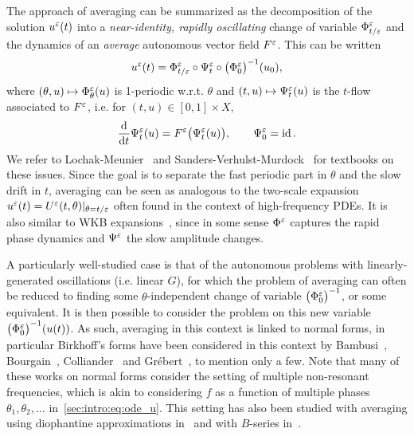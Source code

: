 %

The approach of averaging can be summarized as the decomposition of the
solution \( u^\varepsilon(t) \) into a \textit{near-identity, rapidly oscillating}
change of variable \(\Phi^\varepsilon_{t/\varepsilon} \) and the dynamics of an
\textit{average} autonomous vector field \( F^\varepsilon \). This can be written
\begin{equation} \label{sec:intro:eq:decomp_u}
  u^\varepsilon(t) = \Phi^\varepsilon_{t/\varepsilon} \circ \Psi^\varepsilon_t \circ 
    \big( \Phi^\varepsilon_0 \big)^{-1} (u_0), 
\end{equation}
where \( (\theta,u) \mapsto \Phi^\varepsilon_\theta(u) \) is 1-periodic w.r.t.
\( \theta \) and \( (t,u) \mapsto \Psi^\varepsilon_t(u) \) is the $t$-flow
associated to \( F^\varepsilon \), i.e. for $(t,u) \in [0,1] \times X$, 
\begin{equation}
  \frac{\mathrm{d}}{\mathrm{d} t} \Psi^\varepsilon_t(u) = F^\varepsilon \big( \Psi^\varepsilon_t(u) \big) ,
  \qquad \Psi^\varepsilon_0 = \operatorname{id} . 
\end{equation}
We refer to Lochak-Meunier~\cite{lochak.1988.multiphase} and
Sanders-Verhulst-Murdock~\cite{sanders.2007.averaging} for textbooks on
these issues. Since the goal is to separate the fast periodic part in
$\theta$ and the slow drift in $t$, averaging can be seen as analogous
to the two-scale expansion $u^\varepsilon(t) = U^\varepsilon(t, \theta) |_{\theta =
t/\varepsilon}$ often found in the context of high-frequency PDEs. It is also
similar to WKB expansions~\cite{wentzel.1926.eine,
kramers.1926.wellenmechanik, brillouin.1926.remarques}, since in some
sense $\Phi^\varepsilon$ captures the rapid phase dynamics and $\Psi^\varepsilon$ the
slow amplitude changes. 

A particularly well-studied case is that of the autonomous problems with
linearly-generated oscillations (i.e. linear $G$), for which the problem
of averaging can often be reduced to finding some $\theta$-independent
change of variable $\big( \Phi^\varepsilon_0 \big) ^{-1}$, or some equivalent.
It is then possible to consider the problem on this new variable
$\big(\Phi^\varepsilon_0 \big)^{-1} (u(t))$. As such, averaging in this context
is linked to normal forms, in particular Birkhoff's forms have been
considered in this context by Bambusi~\cite{bambusi.2003.birkhoff,
bambusi.2005.birkhoff-lewis, bambusi.2006.birkhoff,
bambusi.2008.birkhoff}, Bourgain~\cite{bourgain.1996.construction},
Colliander~\cite{colliander.2010.transfer, colliander.2012.remark} and
Grébert~\cite{bambusi.2006.birkhoff, grebert.2011.energy,
grebert.2012.resonant}, to mention only a few. 
%
Note that many of these works on normal forms consider the setting of
multiple non-resonant frequencies, which is akin to considering $f$ as a
function of multiple phases $\theta_1, \theta_2, \ldots$
in~\eqref{sec:intro:eq:ode_u}. This setting has also been studied with
averaging using diophantine approximations
in~\cite{chartier.2017.convergence} and with $B$-series
in~\cite{chartier.2012.higher}. 


